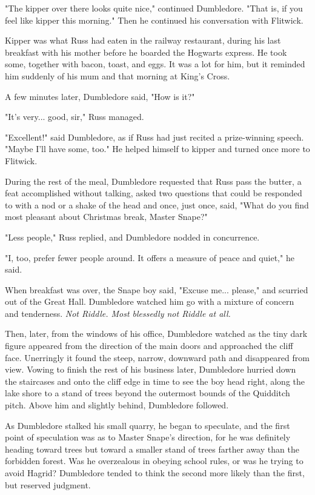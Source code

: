 \documentclass[a4paper,11pt]{article}
\begin{document}
"The kipper over there looks quite nice," continued Dumbledore. "That is, if you feel like kipper this morning." Then he continued his conversation with Flitwick.

Kipper was what Russ had eaten in the railway restaurant, during his last breakfast with his mother before he boarded the Hogwarts express. He took some, together with bacon, toast, and eggs. It was a lot for him, but it reminded him suddenly of his mum and that morning at King's Cross.

A few minutes later, Dumbledore said, "How is it?"

"It's very... good, sir," Russ managed.

"Excellent!" said Dumbledore, as if Russ had just recited a prize-winning speech. "Maybe I'll have some, too." He helped himself to kipper and turned once more to Flitwick.

During the rest of the meal, Dumbledore requested that Russ pass the butter, a feat accomplished without talking, asked two questions that could be responded to with a nod or a shake of the head and once, just once, said, "What do you find most pleasant about Christmas break, Master Snape?"

"Less people," Russ replied, and Dumbledore nodded in concurrence.

"I, too, prefer fewer people around. It offers a measure of peace and quiet," he said.

When breakfast was over, the Snape boy said, "Excuse me... please," and scurried out of the Great Hall. Dumbledore watched him go with a mixture of concern and tenderness. \emph{Not Riddle. Most blessedly not Riddle at all.}

Then, later, from the windows of his office, Dumbledore watched as the tiny dark figure appeared from the direction of the main doors and approached the cliff face. Unerringly it found the steep, narrow, downward path and disappeared from view. Vowing to finish the rest of his business later, Dumbledore hurried down the staircases and onto the cliff edge in time to see the boy head right, along the lake shore to a stand of trees beyond the outermost bounds of the Quidditch pitch. Above him and slightly behind, Dumbledore followed.

As Dumbledore stalked his small quarry, he began to speculate, and the first point of speculation was as to Master Snape's direction, for he was definitely heading toward trees but toward a smaller stand of trees farther away than the forbidden forest. Was he overzealous in obeying school rules, or was he trying to avoid Hagrid? Dumbledore tended to think the second more likely than the first, but reserved judgment.
\end{document}
